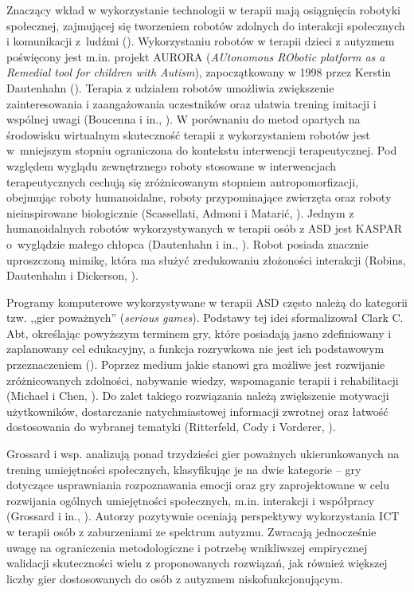     Znaczący wkład w wykorzystanie technologii w terapii mają osiągnięcia robotyki społecznej, zajmującej się tworzeniem robotów zdolnych do interakcji społecznych i komunikacji z~ludźmi (\cite{breazeal2004designing}).
    Wykorzystaniu robotów w terapii dzieci z autyzmem poświęcony jest m.in. projekt AURORA (\emph{AUtonomous RObotic platform as a Remedial tool for children with Autism}), zapoczątkowany w 1998 przez Kerstin Dautenhahn (\cite{dautenhahn1999robots}).
    Terapia z udziałem robotów umożliwia zwiększenie zainteresowania i zaangażowania uczestników oraz ułatwia trening imitacji i wspólnej uwagi (Boucenna i in., \cite*{boucenna2014interactive}).
    W porównaniu do metod opartych na środowisku wirtualnym skuteczność terapii z wykorzystaniem robotów jest w~mniejszym stopniu ograniczona do kontekstu interwencji terapeutycznej.
    Pod względem wyglądu zewnętrznego roboty stosowane w interwencjach terapeutycznych cechują się zróżnicowanym stopniem antropomorfizacji, obejmując roboty humanoidalne, roboty przypominające zwierzęta oraz roboty nieinspirowane biologicznie (Scassellati, Admoni i Matari{\'c}, \cite*{scassellati2012robots}).
    Jednym z humanoidalnych robotów wykorzystywanych w terapii osób z ASD jest KASPAR o~wyglądzie małego chłopca (Dautenhahn i in., \cite*{dautenhahn2009kaspar}).
    Robot posiada znacznie uproszczoną mimikę, która ma służyć zredukowaniu złożoności interakcji (Robins, Dautenhahn i Dickerson, \cite*{robins2009isolation}).
    
    Programy komputerowe wykorzystywane w terapii ASD często należą do kategorii tzw. ,,gier poważnych'' (\emph{serious games}).
    Podstawy tej idei sformalizował Clark C. Abt, określając powyższym terminem gry, które posiadają jasno zdefiniowany i zaplanowany cel edukacyjny, a funkcja rozrywkowa nie jest ich podstawowym przeznaczeniem (\cite{abt1987serious}). 
    Poprzez medium jakie stanowi gra możliwe jest rozwijanie zróżnicowanych zdolności, nabywanie wiedzy, wspomaganie terapii i rehabilitacji (Michael i Chen, \cite*{michael2005serious}). %
    Do zalet takiego rozwiązania należą zwiększenie motywacji użytkowników, dostarczanie natychmiastowej informacji zwrotnej oraz łatwość dostosowania do wybranej tematyki (Ritterfeld, Cody i Vorderer, \cite*{ritterfeld2009serious}).
    
    Grossard i wsp. analizują ponad trzydzieści gier poważnych ukierunkowanych na trening umiejętności społecznych, klasyfikując je na dwie kategorie -- gry dotyczące usprawniania rozpoznawania emocji oraz gry zaprojektowane w celu rozwijania ogólnych umiejętności społecznych, m.in. interakcji i współpracy (Grossard i in., \cite*{grossard2017serious}).
    Autorzy pozytywnie oceniają perspektywy wykorzystania ICT w terapii osób z zaburzeniami ze spektrum autyzmu.
    Zwracają jednocześnie uwagę na ograniczenia metodologiczne i potrzebę wnikliwszej empirycznej walidacji skuteczności wielu z proponowanych rozwiązań, jak również większej liczby gier dostosowanych do osób z autyzmem niskofunkcjonującym.
    
